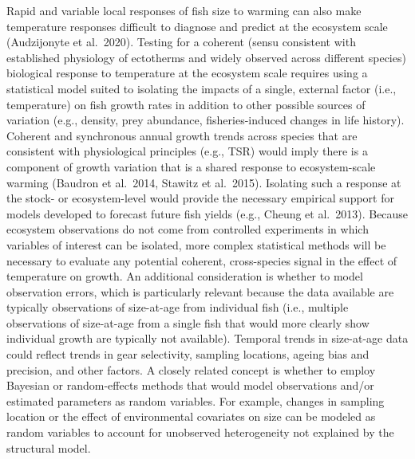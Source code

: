 \documentclass[
]{article}
\begin{document}
Rapid and variable local responses of fish size to warming can also make
temperature responses difficult to diagnose and predict at the ecosystem
scale (Audzijonyte et al.~2020). Testing for a coherent (sensu
consistent with established physiology of ectotherms and widely observed
across different species) biological response to temperature at the
ecosystem scale requires using a statistical model suited to isolating
the impacts of a single, external factor (i.e., temperature) on fish
growth rates in addition to other possible sources of variation (e.g.,
density, prey abundance, fisheries-induced changes in life history).
Coherent and synchronous annual growth trends across species that are
consistent with physiological principles (e.g., TSR) would imply there
is a component of growth variation that is a shared response to
ecosystem-scale warming (Baudron et al.~2014, Stawitz et al.~2015).
Isolating such a response at the stock- or ecosystem-level would provide
the necessary empirical support for models developed to forecast future
fish yields (e.g., Cheung et al.~2013). Because ecosystem observations
do not come from controlled experiments in which variables of interest
can be isolated, more complex statistical methods will be necessary to
evaluate any potential coherent, cross-species signal in the effect of
temperature on growth. An additional consideration is whether to model
observation errors, which is particularly relevant because the data
available are typically observations of size-at-age from individual fish
(i.e., multiple observations of size-at-age from a single fish that
would more clearly show individual growth are typically not available).
Temporal trends in size-at-age data could reflect trends in gear
selectivity, sampling locations, ageing bias and precision, and other
factors. A closely related concept is whether to employ Bayesian or
random-effects methods that would model observations and/or estimated
parameters as random variables. For example, changes in sampling
location or the effect of environmental covariates on size can be
modeled as random variables to account for unobserved heterogeneity not
explained by the structural model.
\end{document}
